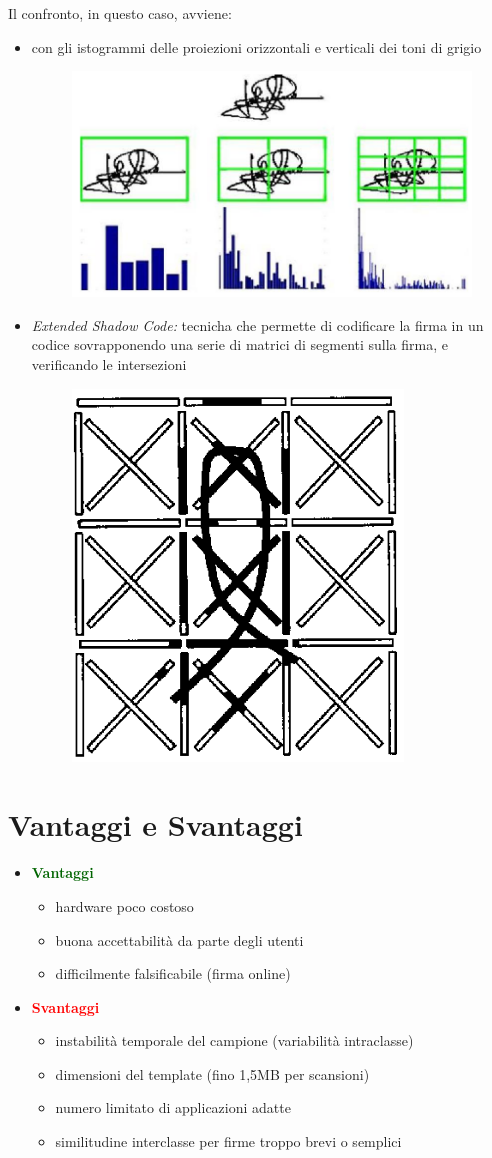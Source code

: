 \documentclass{report}
\begin{document}
Il confronto, in questo caso, avviene:
\begin{itemize}
    \item con gli istogrammi delle proiezioni orizzontali e verticali dei toni di grigio
    \begin{figure}[ht]
        \centering
        \includegraphics[width=0.55\linewidth]{images/isto.png}
    \end{figure}
    \item \textit{Extended Shadow Code:} tecnicha che permette di codificare 
    la firma in un codice sovrapponendo una serie di matrici di segmenti sulla firma, 
    e verificando le intersezioni 
    \begin{figure}[ht]
        \centering
        \includegraphics[width=0.3\linewidth]{images/shadow.png}
    \end{figure}
\end{itemize}

\section{Vantaggi e Svantaggi}
\begin{itemize}
    \item \textcolor{darkgreen}{\textbf{Vantaggi}}
    \begin{itemize}
        \item hardware poco costoso
        \item buona accettabilità da parte degli utenti 
        \item difficilmente falsificabile (firma online)
    \end{itemize}
    \item \textcolor{red}{\textbf{Svantaggi}}
    \begin{itemize}
        \item instabilità temporale del campione (variabilità intraclasse)
        \item dimensioni del template (fino 1,5MB per scansioni)
        \item numero limitato di applicazioni adatte
        \item similitudine interclasse per firme troppo brevi o semplici
    \end{itemize}
\end{itemize}
\end{document}
